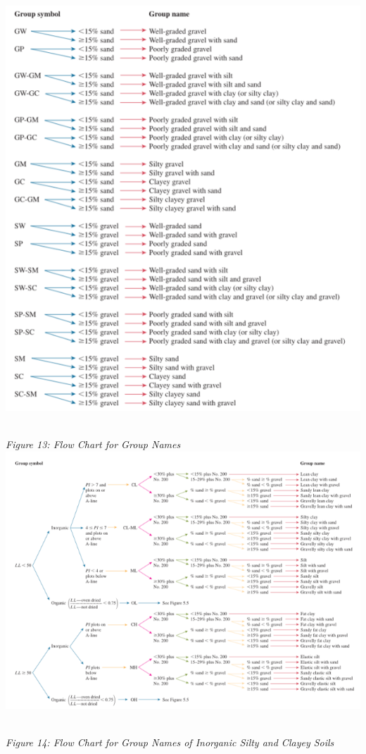\documentclass{article}
\begin{document}
\begin{center}
\includegraphics*[scale=0.7]{fig5.png}
\emph{\\Figure 13: Flow Chart for Group Names\\}
\includegraphics*[scale=0.8]{fig6.png}
\emph{\\Figure 14: Flow Chart for Group Names of Inorganic Silty and Clayey Soils\\}
\end{center}
\newpage
\end{document}
